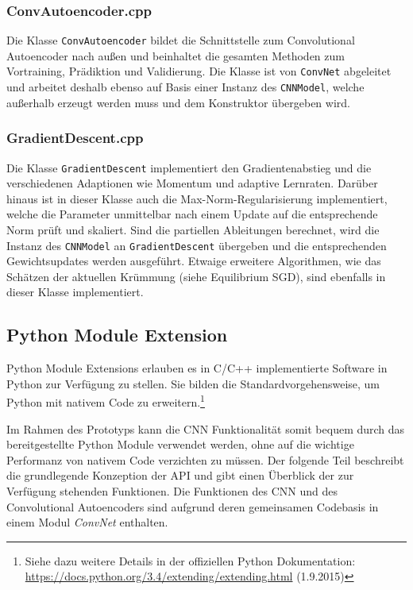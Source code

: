 \subsubsection{ConvAutoencoder.cpp}
Die Klasse \texttt{ConvAutoencoder} bildet die Schnittstelle zum Convolutional Autoencoder nach außen und beinhaltet die gesamten Methoden zum Vortraining, Prädiktion und Validierung. Die Klasse ist von \texttt{ConvNet} abgeleitet und arbeitet deshalb ebenso auf Basis einer Instanz des \texttt{CNNModel}, welche außerhalb erzeugt werden muss und dem Konstruktor übergeben wird. 

\subsubsection{GradientDescent.cpp}
Die Klasse \texttt{GradientDescent} implementiert den Gradientenabstieg und die verschiedenen Adaptionen wie Momentum und adaptive Lernraten. Da\-rüber hinaus ist in dieser Klasse auch die Max-Norm-Regularisierung implementiert, welche die Parameter unmittelbar nach einem Update auf die entsprechende Norm prüft und skaliert.
Sind die partiellen Ableitungen berechnet, wird die Instanz des \texttt{CNNModel} an \texttt{GradientDescent} übergeben und die entsprechenden Gewichtsupdates werden ausgeführt. Etwaige erweitere Algorithmen, wie das Schätzen der aktuellen Krümmung (siehe Equilibrium SGD), sind ebenfalls in dieser Klasse implementiert.


\subsection{Python Module Extension}
Python Module Extensions erlauben es in C/C++ implementierte Software in Python zur Verfügung zu stellen. Sie bilden die Standardvorgehensweise, um Python mit nativem Code zu erweitern.\footnote{Siehe dazu weitere Details in der offiziellen Python Dokumentation: \url{https://docs.python.org/3.4/extending/extending.html} (1.9.2015)}

Im Rahmen des Prototyps kann die CNN Funktionalität somit bequem durch das bereitgestellte Python Module verwendet werden, ohne auf die wichtige Performanz von nativem Code verzichten zu müssen.
Der folgende Teil beschreibt die grundlegende Konzeption der API und gibt einen Überblick der zur Verfügung stehenden Funktionen. Die Funktionen des CNN und des Convolutional Autoencoders sind aufgrund deren gemeinsamen Codebasis in einem Modul \textit{ConvNet} enthalten.

